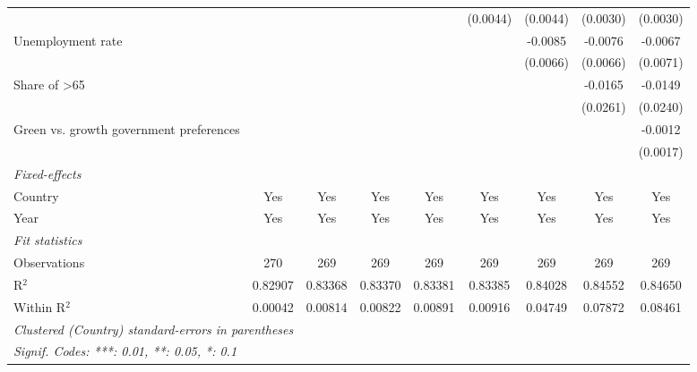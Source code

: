 \begin{table}[htbp]
\begin{tabular}{lcccccccc}
                                                               &          &          &          &                       & (0.0044) & (0.0044)              & (0.0030) & (0.0030)\\   
      Unemployment rate                                        &          &          &          &                       &          & -0.0085               & -0.0076  & -0.0067\\   
                                                               &          &          &          &                       &          & (0.0066)              & (0.0066) & (0.0071)\\   
      Share of >65                                             &          &          &          &                       &          &                       & -0.0165  & -0.0149\\   
                                                               &          &          &          &                       &          &                       & (0.0261) & (0.0240)\\   
      Green vs. growth government preferences                  &          &          &          &                       &          &                       &          & -0.0012\\   
                                                               &          &          &          &                       &          &                       &          & (0.0017)\\   
      \midrule
      \emph{Fixed-effects}\\
      Country                                                  & Yes      & Yes      & Yes      & Yes                   & Yes      & Yes                   & Yes      & Yes\\  
      Year                                                     & Yes      & Yes      & Yes      & Yes                   & Yes      & Yes                   & Yes      & Yes\\  
      \midrule
      \emph{Fit statistics}\\
      Observations                                             & 270      & 269      & 269      & 269                   & 269      & 269                   & 269      & 269\\  
      R$^2$                                                    & 0.82907  & 0.83368  & 0.83370  & 0.83381               & 0.83385  & 0.84028               & 0.84552  & 0.84650\\  
      Within R$^2$                                             & 0.00042  & 0.00814  & 0.00822  & 0.00891               & 0.00916  & 0.04749               & 0.07872  & 0.08461\\  
      \midrule \midrule
      \multicolumn{9}{l}{\emph{Clustered (Country) standard-errors in parentheses}}\\
      \multicolumn{9}{l}{\emph{Signif. Codes: ***: 0.01, **: 0.05, *: 0.1}}\\
   \end{tabular}
\end{table}



